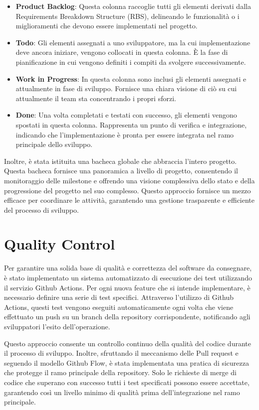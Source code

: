 \begin{itemize}
\item \textbf{Product Backlog}: Questa colonna raccoglie tutti gli elementi derivati dalla Requirements Breakdown Structure (RBS), delineando le funzionalità o i miglioramenti che devono essere implementati nel progetto.
\item \textbf{Todo}: Gli elementi assegnati a uno sviluppatore, ma la cui implementazione deve ancora iniziare, vengono collocati in questa colonna. È la fase di pianificazione in cui vengono definiti i compiti da svolgere successivamente.

\item \textbf{Work in Progress}: In questa colonna sono inclusi gli elementi assegnati e attualmente in fase di sviluppo. Fornisce una chiara visione di ciò su cui attualmente il team sta concentrando i propri sforzi.

\item \textbf{Done}: Una volta completati e testati con successo, gli elementi vengono spostati in questa colonna. Rappresenta un punto di verifica e integrazione, indicando che l'implementazione è pronta per essere integrata nel ramo principale dello sviluppo.
\end{itemize}

Inoltre, è stata istituita una bacheca globale che abbraccia l'intero progetto. Questa bacheca fornisce una panoramica a livello di progetto, consentendo il monitoraggio delle milestone e offrendo una visione complessiva dello stato e della progressione del progetto nel suo complesso. Questo approccio fornisce un mezzo efficace per coordinare le attività, garantendo una gestione trasparente e efficiente del processo di sviluppo.

\section{Quality Control}

Per garantire una solida base di qualità e correttezza del software da consegnare, è stato implementato un sistema automatizzato di esecuzione dei test utilizzando il servizio Github Actions. Per ogni nuova feature che si intende implementare, è necessario definire una serie di test specifici. Attraverso l'utilizzo di Github Actions, questi test vengono eseguiti automaticamente ogni volta che viene effettuato un push su un branch della repository corrispondente, notificando agli sviluppatori l'esito dell'operazione.

Questo approccio consente un controllo continuo della qualità del codice durante il processo di sviluppo. Inoltre, sfruttando il meccanismo delle Pull request e seguendo il modello Github Flow, è stata implementata una pratica di sicurezza che protegge il ramo principale della repository. Solo le richieste di merge di codice che superano con successo tutti i test specificati possono essere accettate, garantendo così un livello minimo di qualità prima dell'integrazione nel ramo principale.

